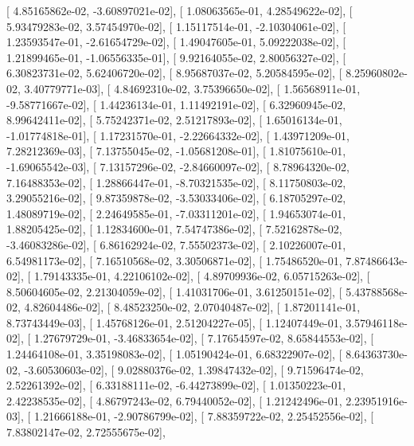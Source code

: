 \documentclass{article}
\begin{document}
       [  4.85165862e-02,  -3.60897021e-02],
       [  1.08063565e-01,   4.28549622e-02],
       [  5.93479283e-02,   3.57454970e-02],
       [  1.15117514e-01,  -2.10304061e-02],
       [  1.23593547e-01,  -2.61654729e-02],
       [  1.49047605e-01,   5.09222038e-02],
       [  1.21899465e-01,  -1.06556335e-01],
       [  9.92164055e-02,   2.80056327e-02],
       [  6.30823731e-02,   5.62406720e-02],
       [  8.95687037e-02,   5.20584595e-02],
       [  8.25960802e-02,   3.40779771e-03],
       [  4.84692310e-02,   3.75396650e-02],
       [  1.56568911e-01,  -9.58771667e-02],
       [  1.44236134e-01,   1.11492191e-02],
       [  6.32960945e-02,   8.99642411e-02],
       [  5.75242371e-02,   2.51217893e-02],
       [  1.65016134e-01,  -1.01774818e-01],
       [  1.17231570e-01,  -2.22664332e-02],
       [  1.43971209e-01,   7.28212369e-03],
       [  7.13755045e-02,  -1.05681208e-01],
       [  1.81075610e-01,  -1.69065542e-03],
       [  7.13157296e-02,  -2.84660097e-02],
       [  8.78964320e-02,   7.16488353e-02],
       [  1.28866447e-01,  -8.70321535e-02],
       [  8.11750803e-02,   3.29055216e-02],
       [  9.87359878e-02,  -3.53033406e-02],
       [  6.18705297e-02,   1.48089719e-02],
       [  2.24649585e-01,  -7.03311201e-02],
       [  1.94653074e-01,   1.88205425e-02],
       [  1.12834600e-01,   7.54747386e-02],
       [  7.52162878e-02,  -3.46083286e-02],
       [  6.86162924e-02,   7.55502373e-02],
       [  2.10226007e-01,   6.54981173e-02],
       [  7.16510568e-02,   3.30506871e-02],
       [  1.75486520e-01,   7.87486643e-02],
       [  1.79143335e-01,   4.22106102e-02],
       [  4.89709936e-02,   6.05715263e-02],
       [  8.50604605e-02,   2.21304059e-02],
       [  1.41031706e-01,   3.61250151e-02],
       [  5.43788568e-02,   4.82604486e-02],
       [  8.48523250e-02,   2.07040487e-02],
       [  1.87201141e-01,   8.73743449e-03],
       [  1.45768126e-01,   2.51204227e-05],
       [  1.12407449e-01,   3.57946118e-02],
       [  1.27679729e-01,  -3.46833654e-02],
       [  7.17654597e-02,   8.65844553e-02],
       [  1.24464108e-01,   3.35198083e-02],
       [  1.05190424e-01,   6.68322907e-02],
       [  8.64363730e-02,  -3.60530603e-02],
       [  9.02880376e-02,   1.39847432e-02],
       [  9.71596474e-02,   2.52261392e-02],
       [  6.33188111e-02,  -6.44273899e-02],
       [  1.01350223e-01,   2.42238535e-02],
       [  4.86797243e-02,   6.79440052e-02],
       [  1.21242496e-01,   2.23951916e-03],
       [  1.21666188e-01,  -2.90786799e-02],
       [  7.88359722e-02,   2.25452556e-02],
       [  7.83802147e-02,   2.72555675e-02],
\end{document}

